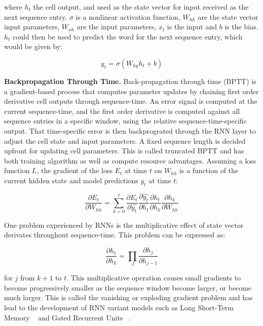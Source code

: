 where $h_t$ the cell output, and used as the state vector for input received as the next sequence entry. $\sigma$ is a nonlinear activation function, $W_{hh}$ are the state vector input parameters, $W_{xh}$ are the input parameters, $x_t$ is the input and $b$ is the bias. $h_t$ could then be used to predict the word for the next sequence entry, which would be given by:

\begin{equation}
	y_t = \sigma(W_{hy}h_{t} + b)
\end{equation}

\textbf{Backpropagation Through Time.} Back-propagation through time (BPTT) is a gradient-based process that computes parameter updates by chaining first order derivative cell outputs through sequence-time. An error signal is computed at the current sequence-time, and the first order derivative is computed against all sequence entries in a specific window, using the relative sequence-time-specific output. That time-specific error is then backprograted through the RNN layer to adjust the cell state and input parameters. A fixed sequence length is decided upfront for updating cell parameters. This is called truncated BPTT and has both training algorithm as well as compute resource advantages. \newpage
Assuming a loss function $L$, the gradient of the loss $E_t$ at time $t$ on $W_{hh}$ is a function of the current hidden state and model predictions $\hat{y_t}$ at time $t$:  

\begin{equation}
\frac{\partial E_t} {\partial W_{hh}} = \sum_{k=0}^{t}\frac{\partial E_t} {\partial \hat{y_t}}\frac{\partial \hat{y_t}} {\partial h_t}\frac{\partial h_t} {\partial h_k}\frac{\partial h_k} {\partial W_{hh}}
\end{equation}

One problem experienced by RNNs is the multiplicative effect of state vector derivates throughout sequence-time. This problem can be expressed as:

\begin{equation}
\frac{\partial h_t} {\partial h_k} = \prod_J\frac{\partial h_j} {\partial h_{j-1}}
\end{equation}

for $j$ from $k + 1$ to $t$. This multiplicative operation causes small gradients to become progressively smaller as the sequence window become larger, or become much larger. This is called the vanishing or exploding gradient problem and has lead to the development of RNN variant models such as Long Short-Term Memory ~\citep{hochreiter1997long} and Gated Recurrent Units ~\citep{cho2014learning}.


